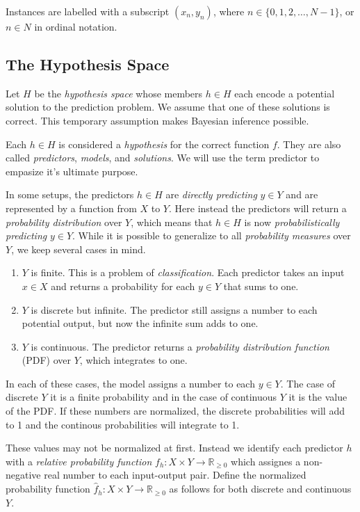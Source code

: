 \documentclass[twoside]{article}
\begin{document}
Instances are labelled with a subscript \((x_n, y_n)\), where \(n \in \{0, 1, 2,\ldots,N-1\}\), or \(n \in N\) in ordinal notation.

\subsection{The Hypothesis Space}

Let \(H\) be the \textit{hypothesis space} whose members \(h \in H\) each encode a potential solution to the prediction problem. We assume that one of these solutions is correct. This temporary assumption makes Bayesian inference possible.

Each \(h \in H\) is considered a \textit{hypothesis} for the correct function \(f\). They are also called \textit{predictors}, \textit{models}, and \textit{solutions}. We will use the term predictor to empasize it's ultimate purpose.

In some setups, the predictors \(h \in H\) are \textit{directly predicting} \(y \in Y\) and are represented by a function from \(X\) to \(Y\). Here instead the predictors will return a \textit{probability distribution} over \(Y\), which means that \(h \in H\) is now \textit{probabilistically predicting} \(y \in Y\). While it is possible to generalize to all \textit{probability measures} over \(Y\), we keep several cases in mind.

\begin{enumerate}
	\item \(Y\) is finite. This is a problem of \textit{classification}. Each predictor takes an input \(x \in X\) and returns a probability for each \(y \in Y\) that sums to one.
	\item \(Y\) is discrete but infinite. The predictor still assigns a number to each potential output, but now the infinite sum adds to one.
	\item \(Y\) is continuous. The predictor returns a \textit{probability distribution function} (PDF) over \(Y\), which integrates to one.
\end{enumerate}

In each of these cases, the model assigns a number to each \(y \in Y\). The case of discrete \(Y\) it is a finite probability and in the case of continuous \(Y\) it is the value of the PDF. If these numbers are normalized, the discrete probabilities will add to 1 and the continous probabilities will integrate to 1.

These values may not be normalized at first. Instead we identify each predictor \(h\) with a \textit{relative probability function} \(f_h: X \times Y \rightarrow \mathbb{R}_{\geq 0}\) which assignes a non-negative real number to each input-output pair. Define the normalized probability function \(\hat{f}_h: X \times Y \rightarrow \mathbb{R}_{\geq 0}\) as follows for both discrete and continuous \(Y\).
\end{document}

